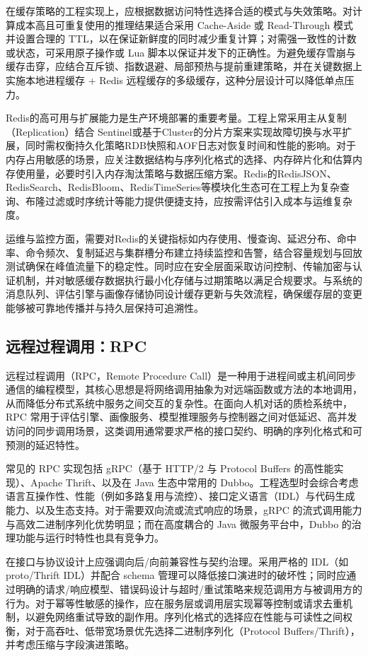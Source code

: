在缓存策略的工程实现上，应根据数据访问特性选择合适的模式与失效策略。对计算成本高且可重复使用的推理结果适合采用 Cache-Aside 或 Read-Through 模式并设置合理的 TTL，以在保证新鲜度的同时减少重复计算；对需强一致性的计数或状态，可采用原子操作或 Lua 脚本以保证并发下的正确性。为避免缓存雪崩与缓存击穿，应结合互斥锁、指数退避、局部预热与提前重建策略，并在关键数据上实施本地进程缓存 + Redis 远程缓存的多级缓存，这种分层设计可以降低单点压力。

Redis的高可用与扩展能力是生产环境部署的重要考量。工程上常采用主从复制（Replication）结合 Sentinel或基于Cluster的分片方案来实现故障切换与水平扩展\cite{electronics13081562}，同时需权衡持久化策略RDB快照和AOF日志对恢复时间和性能的影响。对于内存占用敏感的场景，应关注数据结构与序列化格式的选择、内存碎片化和估算内存使用量，必要时引入内存淘汰策略与数据压缩方案。Redis的RedisJSON、RedisSearch、RedisBloom、RedisTimeSeries等模块化生态可在工程上为复杂查询、布隆过滤或时序统计等能力提供便捷支持，应按需评估引入成本与运维复杂度。

运维与监控方面，需要对Redis的关键指标如内存使用、慢查询、延迟分布、命中率、命令频次、复制延迟与集群槽分布建立持续监控和告警，结合容量规划与回放测试确保在峰值流量下的稳定性。同时应在安全层面采取访问控制、传输加密与认证机制，并对敏感缓存数据执行最小化存储与过期策略以满足合规要求。与系统的消息队列、评估引擎与画像存储协同设计缓存更新与失效流程，确保缓存层的变更能够被可靠地传播并与持久层保持可追溯性。
\subsection{远程过程调用：RPC}
远程过程调用（RPC，Remote Procedure Call）是一种用于进程间或主机间同步通信的编程模型，其核心思想是将网络调用抽象为对远端函数或方法的本地调用，从而降低分布式系统中服务之间交互的复杂性。在面向人机对话的质检系统中，RPC 常用于评估引擎、画像服务、模型推理服务与控制器之间对低延迟、高并发访问的同步调用场景，这类调用通常要求严格的接口契约、明确的序列化格式和可预测的延迟特性。

常见的 RPC 实现包括 gRPC（基于 HTTP/2 与 Protocol Buffers 的高性能实现）、Apache Thrift、以及在 Java 生态中常用的 Dubbo。工程选型时会综合考虑语言互操作性、性能（例如多路复用与流控）、接口定义语言（IDL）与代码生成能力、以及生态支持。对于需要双向流或流式响应的场景，gRPC 的流式调用能力与高效二进制序列化优势明显；而在高度耦合的 Java 微服务平台中，Dubbo 的治理功能与运行时特性也具有竞争力。

在接口与协议设计上应强调向后/向前兼容性与契约治理。采用严格的 IDL（如 proto/Thrift IDL）并配合 schema 管理可以降低接口演进时的破坏性；同时应通过明确的请求/响应模型、错误码设计与超时/重试策略来规范调用方与被调用方的行为。对于幂等性敏感的操作，应在服务层或调用层实现幂等控制或请求去重机制，以避免网络重试导致的副作用。序列化格式的选择应在性能与可读性之间权衡，对于高吞吐、低带宽场景优先选择二进制序列化（Protocol Buffers/Thrift），并考虑压缩与字段演进策略。

